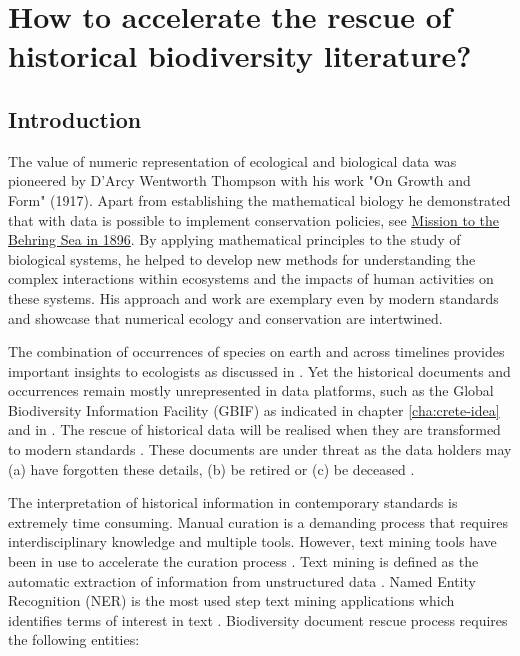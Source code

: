 % 
% 


\chapter{How to accelerate the rescue of historical biodiversity literature?}
\label{cha:deco}


\section{Introduction}
\label{sec:deco-intro}

The value of numeric representation of ecological and biological data was pioneered by D'Arcy Wentworth Thompson
with his work "On Growth and Form" (1917). Apart from establishing the mathematical biology
he demonstrated that with data is possible to implement conservation policies, 
see \href{https://www.biodiversitylibrary.org/item/63749}{Mission to the Behring Sea in 1896}.
By applying mathematical principles to the study of biological systems,
he helped to develop new methods for understanding the complex interactions within
ecosystems and the impacts of human activities on these systems.
His approach and work are exemplary even by modern standards and showcase that 
numerical ecology and conservation are intertwined. 

The combination of occurrences of species on earth and across timelines provides 
important insights to ecologists as discussed in \textcite{levin_problem_1992}.
Yet the historical documents and occurrences remain mostly unrepresented in
data platforms, such as the Global Biodiversity Information Facility (GBIF) \parencite{noauthor_gbif_nodate}
as indicated in chapter \ref{cha:crete-idea} and in \textcite{Paragkamian2022}.
The rescue of historical data will be realised when they are transformed to
modern standards \parencite{bowker_biodiversity_2000,Paragkamian2022}.
These documents are under threat as the data holders may
(a) have forgotten these details, (b) be retired or (c) be deceased \parencite{michener_nongeospatial_1997}.

The interpretation of historical information in contemporary standards 
is extremely time consuming. 
Manual curation is a demanding process that requires interdisciplinary 
knowledge and multiple tools.
However, text mining tools have been in use to accelerate the
curation process \parencite{alex_assisted_2008}. Text mining is defined as the
automatic extraction of information from unstructured data
\parencite{hearst_untangling_1999,10.5555/1199003}.
Named Entity Recognition (NER) is the most used step text mining applications
which identifies terms of interest in text \parencite{perera_named_2020}.
Biodiversity document rescue process requires the following entities:

